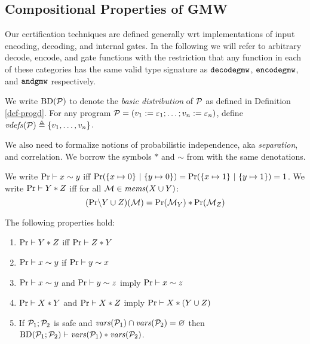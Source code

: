 \subsection{Compositional Properties of GMW}



Our certification techniques are defined generally wrt implementations
of input encoding, decoding, and internal gates. In the following we
will refer to arbitrary decode, encode, and gate functions with the
restriction that any function in each of these categories has the same
valid type signature as $\texttt{decodegmw}$, $\texttt{encodegmw}$, and
$\texttt{andgmw}$ respectively.
\begin{definition}
  We write $\mathrm{BD}(\mathcal{P})$ to denote the \emph{basic distribution} of
  $\mathcal{P}$ as defined in Definition \ref{def-progd}. For any program $\mathcal{P} =
  (v_1 := \varepsilon_1;\ldots;v_n := \varepsilon_n)$, define
  $\mathit{vdefs}(\mathcal{P}) \triangleq \{ v_1,\ldots,v_n \}$.
\end{definition}
We also need to formalize notions of probabilistic independence, aka
\emph{separation}, and correlation. We borrow the symbols $*$ and $\sim$
from \cite{barthe2019probabilistic} with the same denotations.
\begin{definition}
  We write $\mathrm{Pr} \vdash x \sim y$ iff $\mathrm{Pr}(\{ x \mapsto 0\}\ |\ \{ y \mapsto 0 \}) =
  \mathrm{Pr}(\{ x \mapsto 1\}\ |\ \{ y \mapsto 1 \}) = 1$.
  We write $\mathrm{Pr} \vdash Y * Z$ iff for all
    $\mathcal{M} \in \mathit{mems}(X \cup Y)$:
  $$(\mathrm{Pr}\backslash Y \cup Z)(\mathcal{M}) =
  \mathrm{Pr}(\mathcal{M}_Y) * \mathrm{Pr}(\mathcal{M}_Z)$$ 
\end{definition}

\begin{lemma}
  \label{lemma-separation}
  The following properties hold:
  \begin{enumerate}
  \item $\mathrm{Pr} \vdash Y * Z$ iff $\mathrm{Pr} \vdash Z * Y$
  \item $\mathrm{Pr} \vdash x \sim y$ if  $\mathrm{Pr} \vdash y \sim x$
  \item $\mathrm{Pr} \vdash x \sim y$ and $\mathrm{Pr} \vdash y \sim z$ imply $\mathrm{Pr} \vdash x \sim z$
  \item $\mathrm{Pr} \vdash X * Y$ and $\mathrm{Pr} \vdash X * Z$ imply $\mathrm{Pr} \vdash X * (Y \cup Z)$
  \item If $\mathcal{P}_1;\mathcal{P}_2$ is safe and $\mathit{vars}(\mathcal{P}_1) \cap \mathit{vars}(\mathcal{P}_2) = \varnothing$
    then $\mathrm{BD}(\mathcal{P}_1;\mathcal{P}_2) \vdash \mathit{vars}(\mathcal{P}_1) * \mathit{vars}(\mathcal{P}_2)$.
  \end{enumerate}
\end{lemma}

